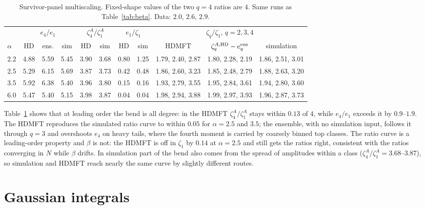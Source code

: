 \documentclass[11pt]{article}
\begin{document}
\begin{table}[htbp]
\centering\small\setlength{\tabcolsep}{4pt}
\begin{tabular}{l|ccc|cc|cc|ccc}
\toprule
 & \multicolumn{3}{c|}{$e_4/e_1$} & \multicolumn{2}{c|}{$\zeta_4^A/\zeta_1^A$} & \multicolumn{2}{c|}{$e_1/\zeta_1$}
 & \multicolumn{3}{c}{$\zeta_q/\zeta_1$, $q=2,3,4$}\\
$\alpha$ & HD & ens. & sim & HD & sim & HD & sim & HDMFT & $\zeta_q^{A,\rm HD}-e_q^{\rm ens}$ & simulation\\
\midrule
2.2 & 4.88 & 5.59 & 5.45 & 3.90 & 3.68 & 0.80 & 1.25 & 1.79, 2.40, 2.87 & 1.80, 2.28, 2.19 & 1.86, 2.51, 3.01\\
2.5 & 5.29 & 6.15 & 5.69 & 3.87 & 3.73 & 0.42 & 0.48 & 1.86, 2.60, 3.23 & 1.85, 2.48, 2.79 & 1.88, 2.63, 3.20\\
3.5 & 5.92 & 6.38 & 5.40 & 3.96 & 3.80 & 0.15 & 0.16 & 1.93, 2.79, 3.55 & 1.95, 2.84, 3.61 & 1.94, 2.80, 3.60\\
6.0 & 5.47 & 5.40 & 5.15 & 3.98 & 3.87 & 0.04 & 0.04 & 1.98, 2.94, 3.88 & 1.99, 2.97, 3.93 & 1.96, 2.87, 3.73\\
\bottomrule
\end{tabular}
\caption{Survivor-panel multiscaling.  Fixed-shape values of the two $q=4$ ratios are $4$.  Same
runs as Table~\ref{tab:beta}.  Data: $2.0$, $2.6$, $2.9$.}
\label{tab:zeta}
\end{table}

Table~\ref{tab:zeta} shows that at leading order the bend is all degree: in the HDMFT
$\zeta_4^A/\zeta_1^A$ stays within $0.13$ of $4$, while $e_4/e_1$ exceeds it by $0.9$--$1.9$.  The
HDMFT reproduces the simulated ratio curve to within $0.05$ for $\alpha=2.5$ and $3.5$; the ensemble,
with no simulation input, follows it through $q=3$ and overshoots $e_4$ on heavy tails, where the
fourth moment is carried by coarsely binned top classes.  The ratio curve is a leading-order
property and $\beta$ is not: the HDMFT is off in $\zeta_1$ by $0.14$ at $\alpha=2.5$ and still gets
the ratios right, consistent with the ratios converging in $N$ while $\beta$ drifts.  In simulation
part of the bend also comes from the spread of amplitudes within a class ($\zeta_4^A/\zeta_1^A=
3.68$--$3.87$), so simulation and HDMFT reach nearly the same curve by slightly different routes.

\section{Gaussian integrals}
\label{app:gauss}
\end{document}
